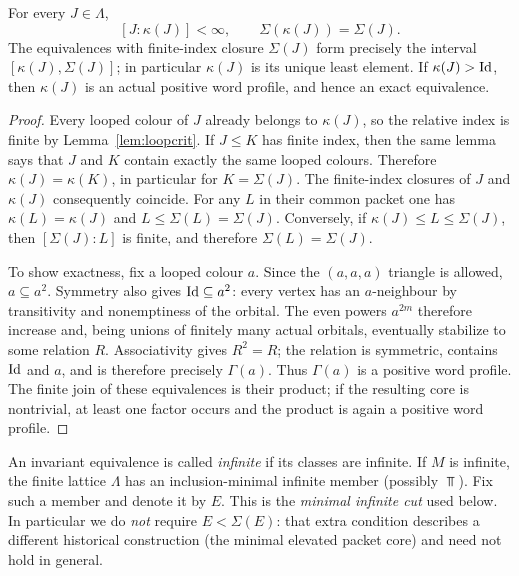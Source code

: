 \begin{lemma}
\label{lem:packetinterval}
For every $J\in\Lambda$,
\[
 [J:\kappa(J)]<\infty,
 \qquad \Sigma(\kappa(J))=\Sigma(J).
\]
The equivalences with finite-index closure $\Sigma(J)$ form precisely
the interval $[\kappa(J),\Sigma(J)]$; in particular $\kappa(J)$ is its
unique least element.  If $\kappa(J)>\mathrm{Id}$, then $\kappa(J)$ is an
actual positive word profile, and hence an exact equivalence.
\end{lemma}
\begin{proof}
Every looped colour of $J$ already belongs to $\kappa(J)$,
so the relative index is finite by Lemma~\ref{lem:loopcrit}.
If $J\le K$ has finite index, then the same lemma says that
$J$ and $K$ contain exactly the same looped colours.  Therefore
$\kappa(J)=\kappa(K)$, in particular for $K=\Sigma(J)$.
The finite-index closures of $J$ and $\kappa(J)$ consequently
coincide.  For any $L$ in their common packet one has
$\kappa(L)=\kappa(J)$ and $L\le\Sigma(L)=\Sigma(J)$.
Conversely, if $\kappa(J)\le L\le\Sigma(J)$, then
$[\Sigma(J):L]$ is finite, and therefore $\Sigma(L)=\Sigma(J)$.

To show exactness, fix a looped colour $a$.  Since the
$(a,a,a)$ triangle is allowed, $a\subseteq a^2$.  Symmetry also
gives $\mathrm{Id}\subseteq a^2$: every vertex has an $a$-neighbour by
transitivity and nonemptiness of the orbital.  The even powers
$a^{2m}$ therefore increase and, being unions of finitely many
actual orbitals, eventually stabilize to some relation $R$.
Associativity gives $R^2=R$; the relation is symmetric, contains
$\mathrm{Id}$ and $a$, and is therefore precisely $\Gamma(a)$.
Thus $\Gamma(a)$ is a positive word profile.  The finite join of
these equivalences is their product; if the resulting core is
nontrivial, at least one factor occurs and the product is again
a positive word profile.
\end{proof}

An invariant equivalence is called \emph{infinite} if its classes
are infinite.  If $M$ is infinite, the finite lattice $\Lambda$ has
an inclusion-minimal infinite member (possibly $\Top$).  Fix such a
member and denote it by $E$.  This is the \emph{minimal infinite cut}
used below.  In particular we do \emph{not} require $E<\Sigma(E)$:
that extra condition describes a different historical construction
(the minimal elevated packet core) and need not hold in general.

